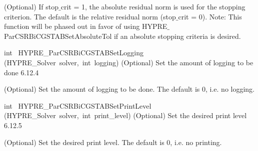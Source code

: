 \documentclass{article}
\begin{document}
\begin{cxxentry}
\begin{cxxentry}
\begin{cxxfunction}
\begin{cxxdoc}
(Optional) If stop$\_$crit = 1, the absolute residual norm is used
for the stopping criterion. The default is the relative residual
norm (stop$\_$crit = 0). Note: This function will be phased out in favor
of using HYPRE$\_$ParCSRBiCGSTABSetAbsoluteTol if an absolute stopping
criteria is desired.
\end{cxxdoc}
\end{cxxfunction}
\begin{cxxfunction}
{int\ }
        {HYPRE\_ParCSRBiCGSTABSetLogging}
        {(HYPRE\_Solver\ solver,\ int\ logging)}
        {
(Optional) Set the amount of logging to be done}
        {6.12.4}
\begin{cxxdoc}

(Optional) Set the amount of logging to be done. The default is 0, i.e.
no logging.
\end{cxxdoc}
\end{cxxfunction}
\begin{cxxfunction}
{int\ }
        {HYPRE\_ParCSRBiCGSTABSetPrintLevel}
        {(HYPRE\_Solver\ solver,\ int\ print\_level)}
        {
(Optional) Set the desired print level}
        {6.12.5}
\begin{cxxdoc}

(Optional) Set the desired print level. The default is 0, i.e. no printing.
\end{cxxdoc}
\end{cxxfunction}
\end{cxxentry}
\end{cxxentry}
\end{document}
